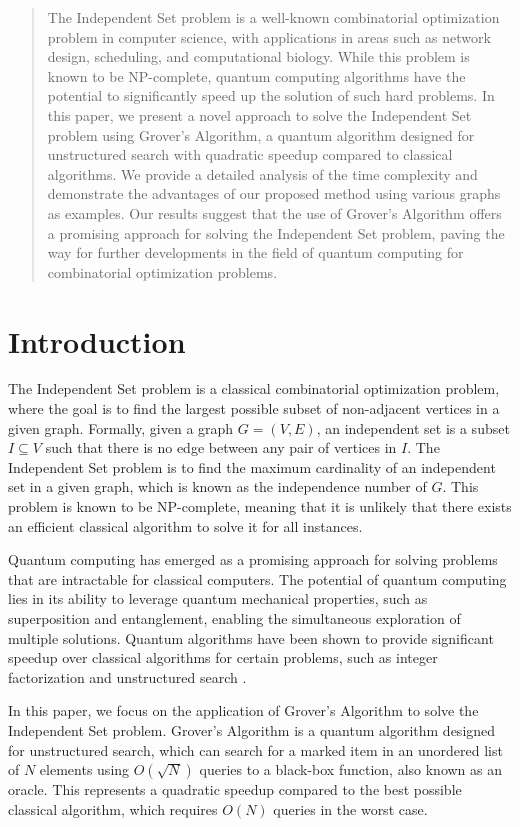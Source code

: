 \begin{abstract}
The Independent Set problem is a well-known combinatorial optimization problem in computer science, with applications in areas such as network design, scheduling, and computational biology. While this problem is known to be NP-complete, quantum computing algorithms have the potential to significantly speed up the solution of such hard problems. In this paper, we present a novel approach to solve the Independent Set problem using Grover's Algorithm, a quantum algorithm designed for unstructured search with quadratic speedup compared to classical algorithms. We provide a detailed analysis of the time complexity and demonstrate the advantages of our proposed method using various graphs as examples. Our results suggest that the use of Grover's Algorithm offers a promising approach for solving the Independent Set problem, paving the way for further developments in the field of quantum computing for combinatorial optimization problems.
\end{abstract}

\section{Introduction}

The Independent Set problem is a classical combinatorial optimization problem, where the goal is to find the largest possible subset of non-adjacent vertices in a given graph. Formally, given a graph $G = (V, E)$, an independent set is a subset $I \subseteq V$ such that there is no edge between any pair of vertices in $I$. The Independent Set problem is to find the maximum cardinality of an independent set in a given graph, which is known as the independence number of $G$. This problem is known to be NP-complete, meaning that it is unlikely that there exists an efficient classical algorithm to solve it for all instances.

Quantum computing has emerged as a promising approach for solving problems that are intractable for classical computers. The potential of quantum computing lies in its ability to leverage quantum mechanical properties, such as superposition and entanglement, enabling the simultaneous exploration of multiple solutions. Quantum algorithms have been shown to provide significant speedup over classical algorithms for certain problems, such as integer factorization \cite{shor1994algorithms} and unstructured search \cite{grover1996fast}.

In this paper, we focus on the application of Grover's Algorithm to solve the Independent Set problem. Grover's Algorithm is a quantum algorithm designed for unstructured search, which can search for a marked item in an unordered list of $N$ elements using $O(\sqrt{N})$ queries to a black-box function, also known as an oracle. This represents a quadratic speedup compared to the best possible classical algorithm, which requires $O(N)$ queries in the worst case.

